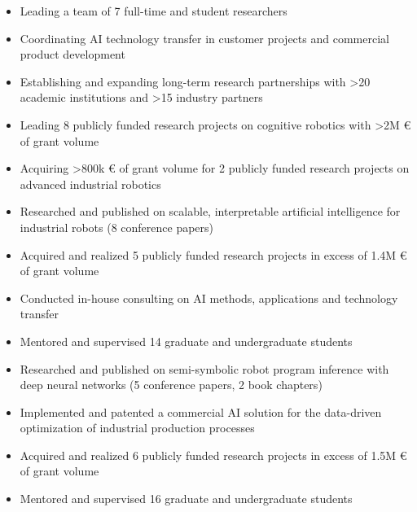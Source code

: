 
\begin{itemize}
  \item Leading a team of 7 full-time and student researchers
  \item Coordinating AI technology transfer in customer projects and commercial product development
  \item Establishing and expanding long-term research partnerships with >20 academic institutions and >15 industry partners
  \item Leading 8 publicly funded research projects on cognitive robotics with >2M € of grant volume
  \item Acquiring >800k € of grant volume for 2 publicly funded research projects on advanced industrial robotics
\end{itemize}

\medskip

\begin{itemize}
  \item Researched and published on scalable, interpretable artificial intelligence for industrial robots (8 conference papers)
  \item Acquired and realized 5 publicly funded research projects in excess of 1.4M € of grant volume
  \item Conducted in-house consulting on AI methods, applications and technology transfer
  \item Mentored and supervised 14 graduate and undergraduate students
\end{itemize}

\medskip

\begin{itemize}
  \item Researched and published on semi-symbolic robot program inference with deep neural networks (5 conference papers, 2 book chapters)
  \item Implemented and patented a commercial AI solution for the data-driven optimization of industrial production processes
  \item Acquired and realized 6 publicly funded research projects in excess of 1.5M € of grant volume
  \item Mentored and supervised 16 graduate and undergraduate students
\end{itemize}

